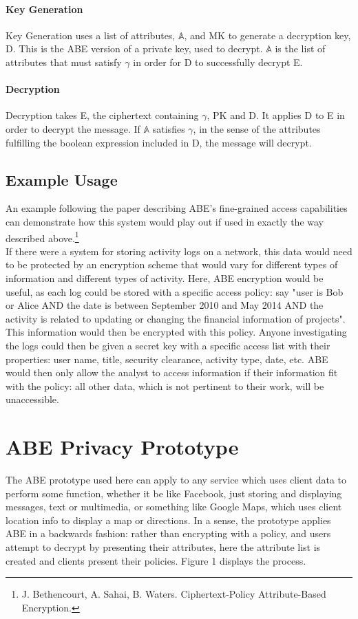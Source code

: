 \documentclass[12pt]{article}
\begin{document}
\paragraph{Key Generation}
Key Generation uses a list of attributes, $\mathbb{A}$, and MK to generate a decryption key, D. This is the ABE version of a private key, used to decrypt. $\mathbb{A}$ is the list of attributes that must satisfy $\gamma$ in order for D to successfully decrypt E. 
\paragraph{Decryption}
Decryption takes E, the ciphertext containing $\gamma$, PK and D. It applies D to E in order to decrypt the message. If $\mathbb{A}$ satisfies $\gamma$, in the sense of the attributes fulfilling the boolean expression included in D, the message will decrypt.

\subsection{Example Usage}
An example following the paper describing ABE's fine-grained access capabilities can demonstrate how this system would play out if used in exactly the way described above.\footnote{J. Bethencourt, A. Sahai, B. Waters. Ciphertext-Policy Attribute-Based Encryption.} \\
If there were a system for storing activity logs on a network, this data would need to be protected by an encryption scheme that would vary for different types of information and different types of activity. Here, ABE encryption would be useful, as each log could be stored with a specific access policy: say "user is Bob or Alice AND the date is between September 2010 and May 2014 AND the activity is related to updating or changing the financial information of projects". This information would then be encrypted with this policy. Anyone investigating the logs could then be given a secret key with a specific access list with their properties: user name, title, security clearance, activity type, date, etc.  ABE would then only allow the analyst to access information if their information fit with the policy: all other data, which is not pertinent to their work, will be unaccessible.

\section{ABE Privacy Prototype}
The ABE prototype used here can apply to any service which uses client data to perform some function, whether it be like Facebook, just storing and displaying messages, text or multimedia, or something like Google Maps, which uses client location info to display a map or directions. In a sense, the prototype applies ABE in a backwards fashion: rather than encrypting with a policy, and users attempt to decrypt by presenting their attributes, here the attribute list is created and clients present their policies. Figure 1 displays the process. \\
\end{document}
